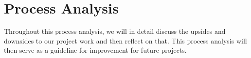 \chapter{Process Analysis}
Throughout this process analysis, we will in detail discuss the upsides and downsides to our project work and then reflect on that. This process analysis will then serve as a guideline for improvement for future projects.








